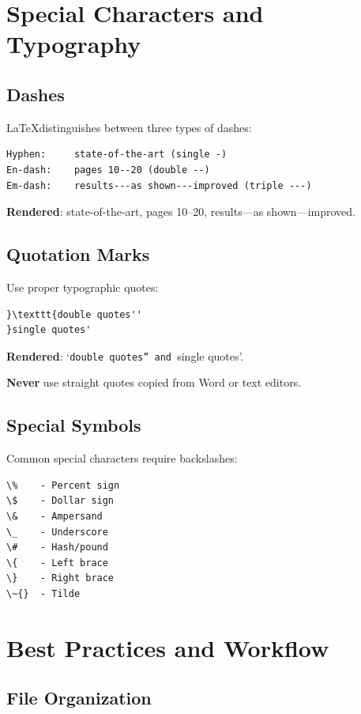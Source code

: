 \section*{Special Characters and Typography}

\subsection*{Dashes}

\LaTeX distinguishes between three types of dashes:

\begin{verbatim}
Hyphen:     state-of-the-art (single -)
En-dash:    pages 10--20 (double --)
Em-dash:    results---as shown---improved (triple ---)
\end{verbatim}

\textbf{Rendered}: state-of-the-art, pages 10--20, results---as shown---improved.

\subsection*{Quotation Marks}

Use proper typographic quotes:

\begin{verbatim}
}\texttt{double quotes''
}single quotes'
\end{verbatim}

\textbf{Rendered}: `\texttt{double quotes'' and }single quotes'.

\textbf{Never} use straight quotes copied from Word or text editors.

\subsection*{Special Symbols}

Common special characters require backslashes:

\begin{verbatim}
\%    - Percent sign
\$    - Dollar sign
\&    - Ampersand
\_    - Underscore
\#    - Hash/pound
\{    - Left brace
\}    - Right brace
\~{}  - Tilde
\end{verbatim}

\section*{Best Practices and Workflow}

\subsection*{File Organization}

